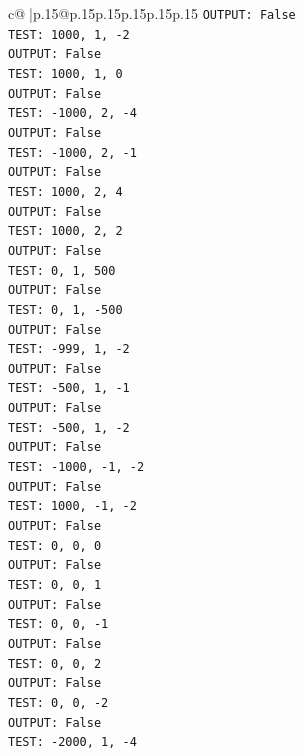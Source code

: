 \documentclass{article}
\begin{document}
{\begin{supertabular}{c@{$\;$}|p{.15\linewidth}@{}p{.15\linewidth}p{.15\linewidth}p{.15\linewidth}p{.15\linewidth}p{.15\linewidth}}
{{{\texttt{OUTPUT: False} \\
\texttt{TEST: 1000, 1, {-}2} \\
\texttt{OUTPUT: False} \\
\texttt{TEST: 1000, 1, 0} \\
\texttt{OUTPUT: False} \\
\texttt{TEST: {-}1000, 2, {-}4} \\
\texttt{OUTPUT: False} \\
\texttt{TEST: {-}1000, 2, {-}1} \\
\texttt{OUTPUT: False} \\
\texttt{TEST: 1000, 2, 4} \\
\texttt{OUTPUT: False} \\
\texttt{TEST: 1000, 2, 2} \\
\texttt{OUTPUT: False} \\
\texttt{TEST: 0, 1, 500} \\
\texttt{OUTPUT: False} \\
\texttt{TEST: 0, 1, {-}500} \\
\texttt{OUTPUT: False} \\
\texttt{TEST: {-}999, 1, {-}2} \\
\texttt{OUTPUT: False} \\
\texttt{TEST: {-}500, 1, {-}1} \\
\texttt{OUTPUT: False} \\
\texttt{TEST: {-}500, 1, {-}2} \\
\texttt{OUTPUT: False} \\
\texttt{TEST: {-}1000, {-}1, {-}2} \\
\texttt{OUTPUT: False} \\
\texttt{TEST: 1000, {-}1, {-}2} \\
\texttt{OUTPUT: False} \\
\texttt{TEST: 0, 0, 0} \\
\texttt{OUTPUT: False} \\
\texttt{TEST: 0, 0, 1} \\
\texttt{OUTPUT: False} \\
\texttt{TEST: 0, 0, {-}1} \\
\texttt{OUTPUT: False} \\
\texttt{TEST: 0, 0, 2} \\
\texttt{OUTPUT: False} \\
\texttt{TEST: 0, 0, {-}2} \\
\texttt{OUTPUT: False} \\
\texttt{TEST: {-}2000, 1, {-}4} \\
}}}
\end{supertabular}}
\end{document}
